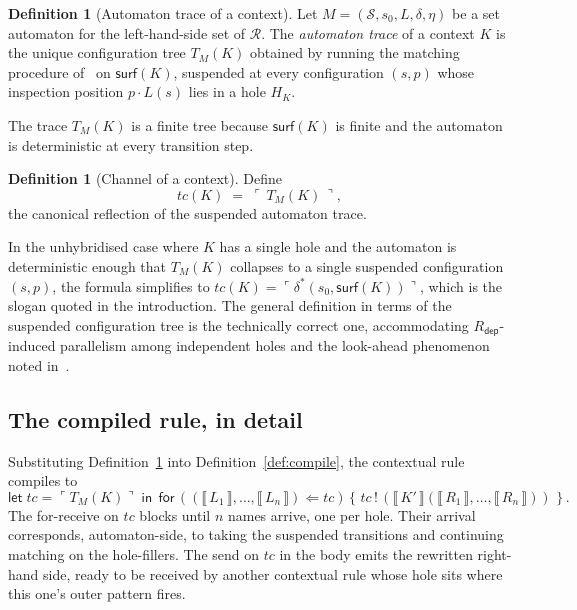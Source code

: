 \documentclass[11pt]{article}
\theoremstyle{plain}
\theoremstyle{definition}
\newtheorem{definition}[theorem]{Definition}
\theoremstyle{remark}
\newcommand{\sem}[1]{\llbracket\,#1\,\rrbracket}
\newcommand{\reflect}[1]{\ulcorner #1 \urcorner}
\newcommand{\States}{\mathcal{S}}
\newcommand{\rdep}{R_{\mathsf{dep}}}
\newcommand{\surface}{\mathsf{surf}}
\newcommand{\Send}[2]{#1 \,!\, (#2)}
\newcommand{\Recv}[3]{\mathsf{for}\,(#1 \Leftarrow #2)\,\{\,#3\,\}}
\newcommand{\Let}[3]{\mathsf{let}\;#1 = #2\;\mathsf{in}\;#3}
\begin{document}
\begin{definition}[Automaton trace of a context]\label{def:trace}
Let $M = (\States, s_{0}, L, \delta, \eta)$ be a set automaton for the
left-hand-side set of $\mathcal{R}$. The \emph{automaton trace} of a context
$K$ is the unique configuration tree $T_{M}(K)$ obtained by running the
matching procedure of~\cite[\S 3]{BouwmanErkens2022} on $\surface(K)$,
suspended at every configuration $(s, p)$ whose inspection position
$p \cdot L(s)$ lies in a hole $H_{K}$.
\end{definition}

The trace $T_{M}(K)$ is a finite tree because $\surface(K)$ is finite and
the automaton is deterministic at every transition step.

\begin{definition}[Channel of a context]\label{def:channel}
Define
\[
  tc(K) \;=\; \reflect{\,T_{M}(K)\,},
\]
the canonical reflection of the suspended automaton trace.
\end{definition}

In the unhybridised case where $K$ has a single hole and the automaton is
deterministic enough that $T_{M}(K)$ collapses to a single suspended
configuration $(s, p)$, the formula simplifies to
$tc(K) = \reflect{\delta^{*}(s_{0}, \surface(K))}$, which is the slogan
quoted in the introduction. The general definition in terms of the
suspended configuration tree is the technically correct one, accommodating
$\rdep$-induced parallelism among independent holes and the look-ahead
phenomenon noted in~\cite[\S 1.1]{BouwmanErkens2022}.

\subsection{The compiled rule, in detail}

Substituting Definition~\ref{def:channel} into Definition~\ref{def:compile},
the contextual rule compiles to
\[
  \Let{tc}{\reflect{T_{M}(K)}}{\,
    \Recv{(\sem{L_{1}}, \ldots, \sem{L_{n}})}{tc}{\,
      \Send{tc}{\sem{K'}(\sem{R_{1}}, \ldots, \sem{R_{n}})}\,}
  \,}.
\]
The for-receive on $tc$ blocks until $n$ names arrive, one per hole. Their
arrival corresponds, automaton-side, to taking the suspended transitions
and continuing matching on the hole-fillers. The send on $tc$ in the body
emits the rewritten right-hand side, ready to be received by another
contextual rule whose hole sits where this one's outer pattern fires.
\end{document}

